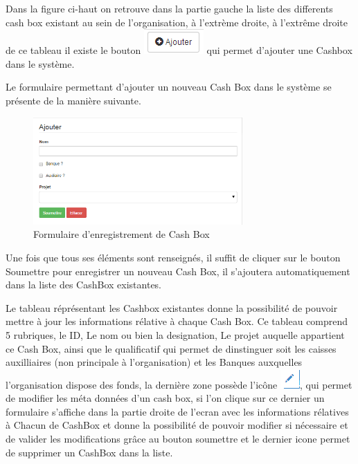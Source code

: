 \documentclass[12pt,a4paper]{report}
\begin{document}
Dans la figure ci-haut on retrouve dans la partie gauche la liste des differents cash box existant au sein de l'organisation, à l'extrème droite, à l'extrême droite de ce tableau il existe le bouton \includegraphics[scale=1]{pic/AddNewStore.png} qui permet d'ajouter une Cashbox dans le système.

Le formulaire permettant d'ajouter un nouveau Cash Box dans le système se présente de la manière suivante.

\begin{figure}[h]
\begin{center}
\includegraphics[width=8cm]{pic/FormAddCash.png} 
\end{center}
\caption{Formulaire d'enregistrement de Cash Box}
\label{Formulaire d'enregistrement de Cash Box}
\end{figure} 

Une fois que tous ses éléments sont renseignés, il suffit de cliquer sur le bouton Soumettre pour enregistrer un nouveau Cash Box, il s'ajoutera automatiquement dans la liste des CashBox existantes. 

Le tableau réprésentant les Cashbox existantes donne la possibilité de pouvoir mettre à jour les informations rélative à chaque Cash Box. Ce tableau comprend 5 rubriques, le ID, Le nom ou bien la designation, Le projet auquelle appartient ce Cash Box, ainsi que le qualificatif qui permet de dinstinguer soit les caisses auxilliaires (non principale à l'organisation) et les Banques auxquelles l'organisation dispose des fonds, la dernière  zone possède l'icône \includegraphics[scale=0.7]{pic/EditUser.png}, qui permet de modifier les méta données d'un cash box, si l'on clique sur ce dernier un formulaire s'affiche dans la partie droite de l'ecran avec les informations rélatives à Chacun de CashBox et donne la possibilité de pouvoir modifier si nécessaire et de valider les modifications grâce au bouton soumettre et le dernier icone permet de supprimer un CashBox dans la liste.
\end{document}
